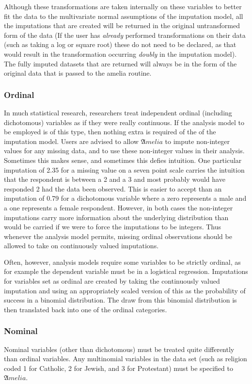 \documentclass[12pt,titlepage]{article}
\begin{document}
Although these transformations are taken internally on these variables
to better fit the data to the multivariate normal assumptions of the
imputation model, all the imputations that are created will be
returned in the original untransformed form of the data (If the user
has \emph{already} performed transformations on their data (such as
taking a log or square root) these do not need to be declared, as that
would result in the transformation occurring \emph{doubly} in the
imputation model).  The fully imputed datasets that are returned will
always be in the form of the original data that is passed to the
amelia routine.

\subsubsection{Ordinal}
\label{sec:ord}
In much statistical research, researchers treat independent ordinal
(including dichotomous) variables as if they were really continuous.
If the analysis model to be employed is of this type, then nothing
extra is required of the of the imputation model. Users are advised to
allow ${\mathfrak Amelia}$ to impute non-integer values for any
missing data, and to use these non-integer values in their analysis.
Sometimes this makes sense, and sometimes this defies intuition. One
particular imputation of 2.35 for a missing value on a seven point
scale carries the intuition that the respondent is between a 2 and a 3
and most probably would have responded 2 had the data been observed.
This is easier to accept than an imputation of 0.79 for a dichotomous
variable where a zero represents a male and a one represents a female
respondent. However, in both cases the non-integer imputations carry
more information about the underlying distribution than would be
carried if we were to force the imputations to be integers. Thus
whenever the analysis model permits, missing ordinal observations
should be allowed to take on continuously valued imputations.

Often, however, analysis models require some variables to be strictly
ordinal, as for example the dependent variable must be in a logistical
regression.  Imputations for variables set as ordinal are created by
taking the continuously valued imputation and using an appropriately
scaled version of this as the probability of success in a binomial
distribution. The draw from this binomial distribution is then
translated back into one of the ordinal categories.

\subsubsection{Nominal}
\label{sec:nom}
Nominal variables (other than dichotomous) must be treated quite
differently than ordinal variables. Any multinomial variables in the
data set (such as religion coded 1 for Catholic, 2 for Jewish, and 3
for Protestant) must be specified to ${\mathfrak Amelia}$.
\end{document}
